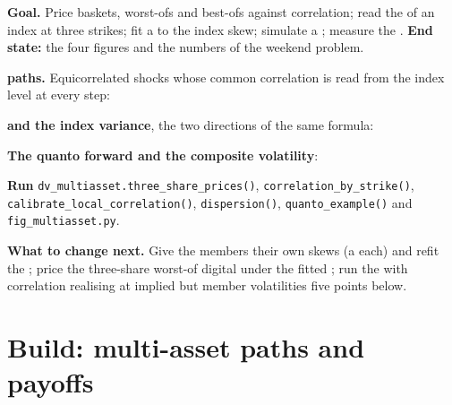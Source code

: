 \begin{tutorial}
\textbf{Goal.} Price baskets, worst-ofs and best-ofs against correlation; read the  of an index at three
strikes; fit a  to the index skew; simulate a ; measure the .
\textbf{End state:} the four figures and the numbers of the weekend problem.
\begin{tutsteps}
\item \textbf{ paths.} Equicorrelated shocks whose common correlation is read from the index level at every
step:
\label{lst:dv:multi-asset-options:lc}
\item \textbf{ and the index variance}, the two directions of the same formula:
\label{lst:dv:multi-asset-options:implied}
\item \textbf{The quanto forward and the composite volatility}:
\label{lst:dv:multi-asset-options:quanto}
\item \textbf{Run} \texttt{dv\_multiasset.three\_share\_prices()}, \texttt{correlation\_by\_strike()},
\texttt{calibrate\_local\_correlation()}, \texttt{dispersion()}, \texttt{quanto\_example()} and \texttt{fig\_multiasset.py}.
\end{tutsteps}
\textbf{What to change next.} Give the members their own skews (a  each) and refit the ;
price the three-share worst-of digital under the fitted ; run the  with correlation realising
at implied but member volatilities five points below.
\end{tutorial}

\section{Build: multi-asset paths and payoffs}\label{bld:dv:multi-asset-options:multiasset}

